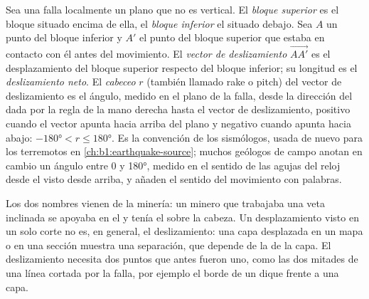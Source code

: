 \begin{definition}\label{def:b1:faults-folds-fabrics:fault-elements}
Sea una falla localmente un plano que no es vertical. El \emph{bloque superior} es el bloque situado
encima de ella, el \emph{bloque inferior} el situado debajo. Sea $A$ un punto del bloque inferior y $A'$
el punto del bloque superior que estaba en contacto con él antes del movimiento. El \emph{vector de deslizamiento}
$\overrightarrow{AA'}$ es el desplazamiento del bloque superior respecto del bloque inferior; su longitud es el
\emph{deslizamiento neto}. El \emph{cabeceo} $r$ (también llamado rake o pitch) del vector de deslizamiento es el ángulo, medido en el plano de la falla, desde la dirección del  dada por
la regla de la mano derecha hasta el vector de deslizamiento, positivo cuando el vector apunta hacia arriba del plano y negativo
cuando apunta hacia abajo: $\ang{-180} < r \le \ang{180}$. Es la convención de los sismólogos, usada de nuevo para los
terremotos en \cref{ch:b1:earthquake-source}; muchos geólogos de campo anotan en cambio un ángulo entre 0 y \ang{180}, medido en
el sentido de las agujas del reloj desde el  visto desde arriba, y añaden el sentido del movimiento con palabras.
\end{definition}

Los dos nombres vienen de la minería: un minero que trabajaba una veta inclinada se apoyaba en el  y tenía el
 sobre la cabeza. Un desplazamiento visto en un solo corte no es, en general, el deslizamiento: una capa
desplazada en un mapa o en una sección muestra una separación, que depende de la  de la capa. El deslizamiento necesita
dos puntos que antes fueron uno, como las dos mitades de una línea cortada por la falla, por ejemplo el borde de un dique
frente a una capa.

